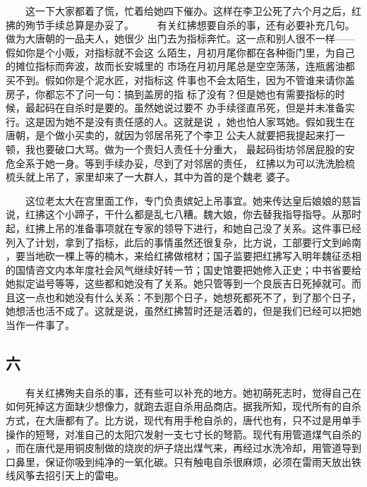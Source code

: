 　　这一下大家都着了慌，忙着给她四下催办。这样在李卫公死了六个月之后，红 拂的殉节手续总算是办妥了。 　　有关红拂想要自杀的事，还有必要补充几句。做为大唐朝的一品夫人，她很少 出门去为指标奔忙。这一点和别人很不一样——假如你是个小贩，对指标就不会这 么陌生，月初月尾你都在各种衙门里，为自己的摊位指标而奔波，故而长安城里的 市场在月初月尾总是空空荡荡，连瓶酱油都买不到。假如你是个泥水匠，对指标这 件事也不会太陌生，因为不管谁来请你盖房子，你都忘不了问一句：搞到盖房的指 标了没有？但是她也有需要指标的时候，最起码在自杀时是要的。虽然她说过要不 办手续径直吊死，但是并未准备实行。这是因为她不是没有责任感的人。这就是说 ，她也怕人家骂她。假如我生在唐朝，是个做小买卖的，就因为邻居吊死了个李卫 公夫人就要把我提起来打一顿，我也要破口大骂。做为一个贵妇人责任十分重大， 最起码街坊邻居屁股的安危全系于她一身。等到手续办妥，尽到了对邻居的责任， 红拂以为可以洗洗脸梳梳头就上吊了，家里却来了一大群人，其中为首的是个魏老 婆子。

 　　这位老太大在宫里面工作，专门负责嫔妃上吊事宜。她来传达皇后娘娘的慈旨 说，红拂这个小蹄子，干什么都是乱七八糟。魏大娘，你去替我指导指导。从那时 起，红拂上吊的准备事项就在专家的领导下进行，和她自己没了关系。这件事已经 列入了计划，拿到了指标，此后的事情虽然还很复杂，比方说，工部要行文到岭南 ，要当地砍一棵上等的楠木，来给红拂做棺材；国子监要把红拂写入明年魏征丞相 的国情咨文内本年度社会风气继续好转一节；国史馆要把她修入正史；中书省要给 她拟定谥号等等，这些都和她没有了关系。她只管等到一个良辰吉日死掉就可。而 且这一点也和她没有什么关系：不到那个日子，她想死都死不了，到了那个日子， 她想活也活不成了。这就是说，虽然红拂暂时还是活着的，但是我们已经可以把她 当作一件事了。 
 
 
\subsection{六} 
 
 　　有关红拂殉夫自杀的事，还有些可以补充的地方。她初萌死志时，觉得自己在 如何死掉这方面缺少想像力，就跑去逛自杀用品商店。据我所知，现代所有的自杀 方式，在大唐都有了。比方说，现代有用手枪自杀的，唐代也有，只不过是用单手 操作的短弩，对准自己的太阳穴发射一支七寸长的弩箭。现代有用管道煤气自杀的 ，而在唐代是用铜皮制做的烧炭的炉子烧出煤气来，再经过水洗冷却，用管道导到 口鼻里，保证你吸到纯净的一氧化碳。只有触电自杀很麻烦，必须在雷雨天放出铁 线风筝去招引天上的雷电。

